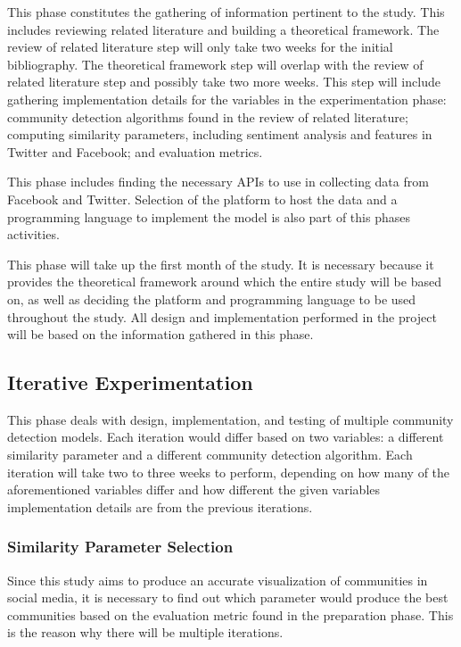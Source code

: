 This phase constitutes the gathering of information pertinent to the study. This includes reviewing related literature and building a theoretical framework. The review of related literature step will only take two weeks for the initial bibliography. The theoretical framework step will overlap with the review of related literature step and possibly take two more weeks. This step will include gathering implementation details for the variables in the experimentation phase: community detection algorithms found in the review of related literature; computing similarity parameters, including sentiment analysis and features in Twitter and Facebook; and evaluation metrics. 

This phase includes finding the necessary API\vtick s to use in collecting data from Facebook and Twitter. Selection of the platform to host the data and a programming language to implement the model is also part of this phase\vtick s activities. 

This phase will take up the first month of the study. It is necessary because it provides the theoretical framework around which the entire study will be based on, as well as deciding the platform and programming language to be used throughout the study. All design and implementation performed in the project will be based on the information gathered in this phase.

\subsection{Iterative Experimentation}

This phase deals with design, implementation, and testing of multiple community detection models. Each iteration would differ based on two variables: a different similarity parameter and a different community detection algorithm. Each iteration will take two to three weeks to perform, depending on how many of the aforementioned variables differ and how different the given variable\vtick s implementation details are from the previous iteration\vtick s.

\subsubsection{Similarity Parameter Selection}

Since this study aims to produce an accurate visualization of communities in social media, it is necessary to find out which parameter would produce the best communities based on the evaluation metric found in the preparation phase. This is the reason why there will be multiple iterations. 

